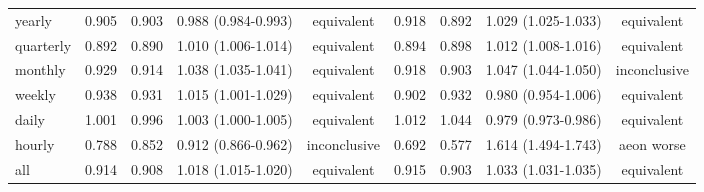 \begin{tabular}{lcccccccc}
\toprule
yearly & 0.905 & 0.903 & 0.988 (0.984-0.993) & equivalent & 0.918 & 0.892 & 1.029 (1.025-1.033) & equivalent \\
quarterly & 0.892 & 0.890 & 1.010 (1.006-1.014) & equivalent & 0.894 & 0.898 & 1.012 (1.008-1.016) & equivalent \\
monthly & 0.929 & 0.914 & 1.038 (1.035-1.041) & equivalent & 0.918 & 0.903 & 1.047 (1.044-1.050) & inconclusive \\
weekly & 0.938 & 0.931 & 1.015 (1.001-1.029) & equivalent & 0.902 & 0.932 & 0.980 (0.954-1.006) & equivalent \\
daily & 1.001 & 0.996 & 1.003 (1.000-1.005) & equivalent & 1.012 & 1.044 & 0.979 (0.973-0.986) & equivalent \\
hourly & 0.788 & 0.852 & 0.912 (0.866-0.962) & inconclusive & 0.692 & 0.577 & 1.614 (1.494-1.743) & aeon worse \\
all & 0.914 & 0.908 & 1.018 (1.015-1.020) & equivalent & 0.915 & 0.903 & 1.033 (1.031-1.035) & equivalent \\
\bottomrule
\end{tabular}

